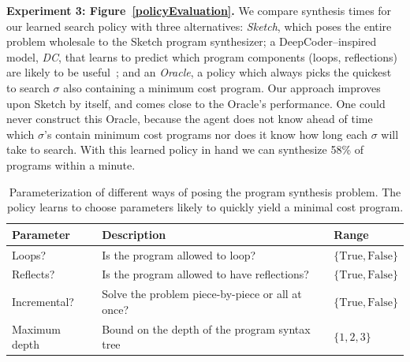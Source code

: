 \documentclass{article}
\theoremstyle{definition}
\begin{document}
\textbf{Experiment 3: Figure~\ref{policyEvaluation}.}
We compare synthesis times for our learned search policy
with three alternatives:
 \emph{Sketch}, which poses the
 entire problem wholesale to the Sketch program synthesizer;
 a DeepCoder--inspired model, \emph{DC}, that learns to predict which program components (loops, reflections)
 are likely to be useful~\cite{BalGauBroetal16};
and an \emph{Oracle},
a policy which always picks the quickest to search $\sigma $
 also containing a minimum cost program.
Our approach improves upon Sketch by itself,
and comes close to the Oracle's performance.
One could never construct this Oracle,
because the agent does not know ahead of time which
$\sigma $'s contain minimum cost programs nor does it know how long each
$\sigma $ will take to search.
With this learned policy in hand we can synthesize 58\% of programs within a minute.
%
\begin{table}[h]\centering
  \caption{Parameterization of different ways of posing the program synthesis problem. The policy learns to choose parameters likely to quickly yield a minimal cost program.
  }\label{policyOutput}
  \begin{tabular}{lll}\toprule
  Parameter&Description&Range\\\midrule
  Loops?&Is the program allowed to loop?&$\{\text{True},\text{False}\}$\\
  Reflects?&Is the program allowed to have reflections?&$\{\text{True},\text{False}\}$\\
  Incremental?&Solve the problem piece-by-piece or all at once?&$\{\text{True},\text{False}\}$\\
  Maximum depth& Bound on the depth of the program syntax tree&$\{1,2,3\}$
  \\\bottomrule
  \end{tabular}
  \end{table}
\end{document}
